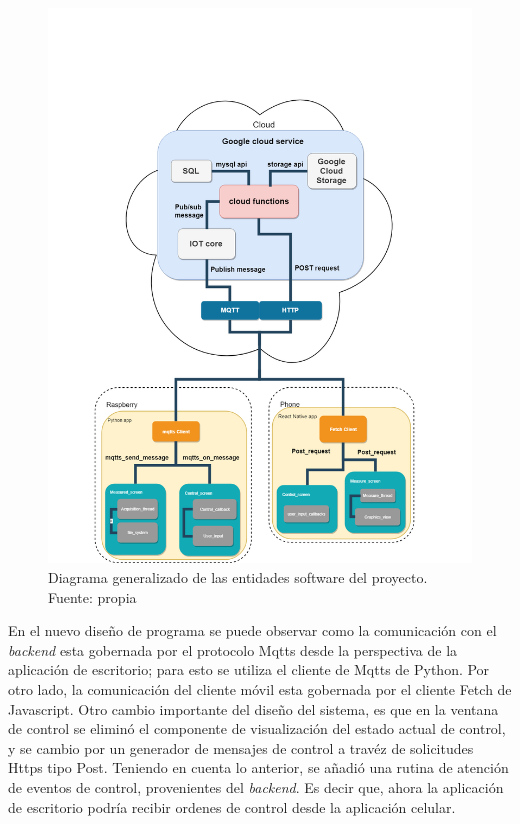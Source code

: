 \begin{figure}[htbp]
	\centering
	\includegraphics[width=15cm]{figuras/GeneralDiagram.png}
	\caption{Diagrama generalizado de las entidades software del proyecto. Fuente: propia}	
	\label{diagramaGeneralizado}
\end{figure}
En el nuevo diseño de programa se puede observar como la comunicación con el \textit{backend} esta gobernada por el protocolo Mqtts desde la perspectiva de la aplicación de escritorio; para esto se utiliza el cliente de Mqtts de Python. Por otro lado, la comunicación del cliente móvil esta gobernada por el cliente Fetch de Javascript. Otro cambio importante del diseño del sistema, es que en la ventana de control se eliminó el componente de visualización del estado actual de control, y se cambio por un generador de mensajes de control a travéz de solicitudes Https tipo Post. Teniendo en cuenta lo anterior, se añadió una rutina de atención de eventos de control, provenientes del \textit{backend}. Es decir que, ahora la aplicación de escritorio podría recibir ordenes de control desde la aplicación celular.
